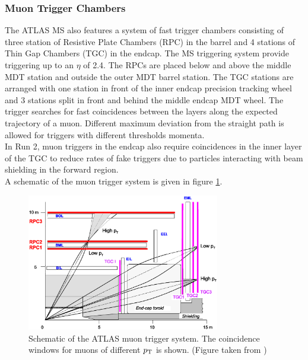 \subsubsection*{Muon Trigger Chambers}

\indent  The ATLAS MS also features a system of fast trigger chambers consisting of three station of Resistive Plate Chambers (RPC) in the barrel and 4 stations of Thin Gap Chambers (TGC) in the endcap.  The MS triggering system provide triggering up to an $\eta$ of 2.4.  The RPCs are placed below and above the middle MDT station and outside the outer MDT barrel station.  The TGC stations are arranged with one station in front of the inner endcap precision tracking wheel and 3 stations split in front and behind the middle endcap MDT wheel.  The trigger searches for fast coincidences between the layers along the expected trajectory of a muon.  Different maximum deviation from the straight path is allowed for triggers with different thresholds momenta. \\

\indent In Run 2, muon triggers in the endcap also require coincidences in the inner layer of the TGC to reduce rates of fake triggers due to particles interacting with beam shielding in the forward region. \\

\indent A schematic of the muon trigger system is given in figure \ref{LHC:fig:MS_trigger}. \\

\begin{figure}[h!]
\centering
\includegraphics[width=0.75\textwidth, angle=0]{figures/LHC_ATLAS/RPC_TGC_schematics_5.eps}
\caption{ Schematic of the ATLAS muon trigger system.  The coincidence windows for muons of different $p_{\mathrm{T}}$ is shown. (Figure taken from \cite{ATLAS_JINST}) \label{LHC:fig:MS_trigger}}
\end{figure}
